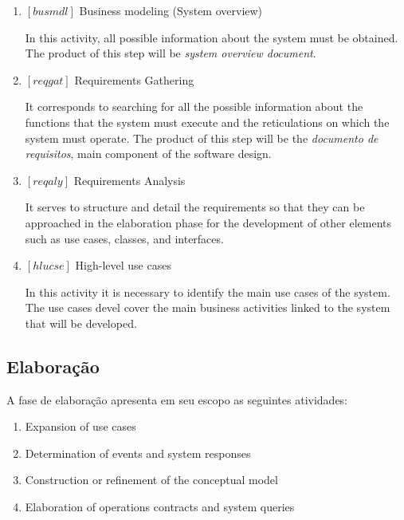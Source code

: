\documentclass[11pt, twoside, a4paper]{book}
\begin{document}
	        			\begin{enumerate}
	        				
	        				\item $[busmdl]$ Business modeling (System overview)
	        					
								In this activity, all possible information about the system must be obtained. The product of this step will be \emph{system overview document}.        				
	        						
					        \item $[reqgat]$ Requirements Gathering
					        
					        	It corresponds to searching for all the possible information about the functions that the system must execute and the reticulations on which the system must operate. The product of this step will be the \emph{documento de requisitos}, main component of the software design.
					        	
							\item $[reqaly]$ Requirements Analysis
							
								It serves to structure and detail the requirements so that they can be approached in the elaboration phase for the development of other elements such as use cases, classes, and interfaces.

							\item $[hlucse]$ High-level use cases
								
								In this activity it is necessary to identify the main use cases of the system. The use cases devel cover the main business activities linked to the system that will be developed.
								
	        			\end{enumerate}
	        			
    	    		\subsection{Elaboração}
    	    		
    	    			A fase de elaboração apresenta em seu escopo as seguintes atividades:
	        			
	        			\begin{enumerate}
	        				
							\item Expansion of use cases								
							\item Determination of events and system responses
							\item Construction or refinement of the conceptual model
							\item Elaboration of operations contracts and system queries
							
	        			\end{enumerate}
	        			
\end{document}
